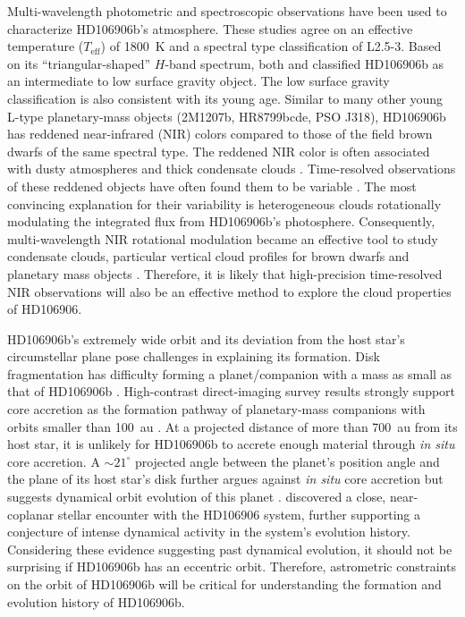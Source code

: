 \documentclass[twocolumn]{aastex62}
\newcommand{\teff}{\ensuremath{T_{\mathrm{eff}}}\xspace}
\begin{document}
Multi-wavelength photometric \citep{Bailey2013,Kalas2015,Wu2016} and spectroscopic \citep{Bailey2013, Daemgen2017} observations have been used to characterize HD106906b's atmosphere.  These studies agree on an effective temperature (\teff) of 1800~K and a spectral type classification of L2.5-3. Based on its ``triangular-shaped'' $H$-band spectrum, both \citet{Bailey2013} and \citet{Daemgen2017} classified HD106906b as an intermediate to low surface gravity object. The low surface gravity classification is also consistent with its young age. Similar to many other young L-type planetary-mass objects (2M1207b, HR8799bcde, PSO J318), HD106906b has reddened near-infrared (NIR) colors compared to those of the field brown dwarfs of the same spectral type. The reddened NIR color is often associated with dusty atmospheres and thick condensate clouds \citep[e.g.,][]{Skemer2011}. Time-resolved observations of these reddened objects have often found  them to be variable \citep[e.g.,][]{Biller2015,Zhou2016,Lew2016,Vos2017,Biller2017,Manjavacas2017,Zhou2019}. The most convincing explanation for their variability is heterogeneous clouds rotationally modulating the integrated flux from HD106906b's photosphere. Consequently, multi-wavelength NIR rotational modulation became an effective tool to study condensate clouds, particular vertical cloud profiles for brown dwarfs and planetary mass objects \citep[e.g.,][]{Apai2013, Biller2017, Zhou2018}. Therefore, it is likely that high-precision time-resolved NIR observations will also be an effective method to explore the cloud properties of HD106906.

HD106906b's extremely wide orbit and its deviation from the host star's circumstellar plane pose challenges in explaining its formation. Disk fragmentation has difficulty forming a planet/companion with a mass as small as that of HD106906b \citep[e.g.,][]{Kratter2010}. High-contrast direct-imaging survey results strongly support core accretion as the formation pathway of planetary-mass companions with orbits smaller than 100~au \citep{Wagner2019,Nielsen2019}.  At a projected distance of more than 700~au from its host star, it is unlikely for HD106906b to accrete enough material through \emph{in situ} core accretion. A $\sim21^{\circ}$ projected angle between the planet's position angle and the plane of its host star's disk \citep{Kalas2015} further argues against \emph{in situ} core accretion but suggests dynamical orbit evolution of this planet \citep[e.g.,][]{Marleau2019}.  \citet{DeRosa2019} discovered a close, near-coplanar stellar encounter with the HD106906 system, further supporting a conjecture of intense dynamical activity in the system's evolution history. Considering these evidence suggesting past dynamical evolution, it should not be surprising if HD106906b has an eccentric orbit. Therefore, astrometric constraints on the orbit of HD106906b will be critical for understanding the formation and evolution history of HD106906b.
\end{document}
